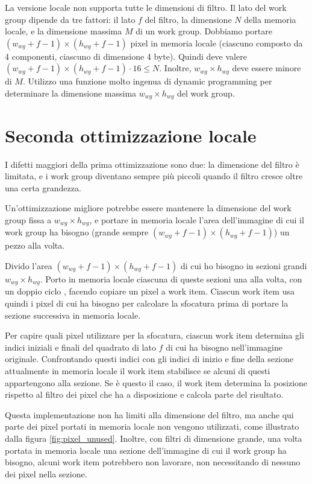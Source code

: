 \documentclass[10pt]{myarticle}
\begin{document}
La versione locale non supporta tutte le dimensioni di filtro.
Il lato del work group dipende da tre fattori: il lato $f$ del filtro, la dimensione $N$ della memoria locale, e la dimensione massima $M$ di un work group.
Dobbiamo portare $(w_{wg} + f - 1) \times (h_{wg} + f - 1)$ pixel in memoria locale (ciascuno composto da 4 componenti, ciascuno di dimensione 4 byte).
Quindi deve valere $(w_{wg} + f - 1) \times (h_{wg} + f - 1) \cdot 16 \le N$.
Inoltre, $w_{wg} \times h_{wg}$ deve essere minore di $M$.
Utilizzo una funzione molto ingenua di dynamic programming per determinare la dimensione massima $w_{wg} \times h_{wg}$ del work group.


\section{Seconda ottimizzazione locale}

I difetti maggiori della prima ottimizzazione sono due: la dimensione del filtro \`e limitata, e i work group diventano sempre pi\`u piccoli quando il filtro cresce oltre una certa grandezza.

Un'ottimizzazione migliore potrebbe essere mantenere la dimensione del work group fissa a $w_{wg} \times h_{wg}$, e portare in memoria locale l'area dell'immagine di cui il work group ha bisogno (grande sempre $(w_{wg} + f - 1) \times (h_{wg} + f - 1)$) un pezzo alla volta.

Divido l'area $(w_{wg} + f - 1) \times (h_{wg} + f - 1)$ di cui ho bisogno in sezioni grandi $w_{wg} \times h_{wg}$.
Porto in memoria locale ciascuna di queste sezioni una alla volta, con un doppio ciclo , facendo copiare un pixel a work item.
Ciascun work item usa quindi i pixel di cui ha bisogno per calcolare la sfocatura prima di portare la sezione successiva in memoria locale.

Per capire quali pixel utilizzare per la sfocatura, ciascun work item determina gli indici iniziali e finali del quadrato di lato $f$ di cui ha bisogno nell'immagine originale.
Confrontando questi indici con gli indici di inizio e fine della sezione attualmente in memoria locale il work item stabilisce se alcuni di questi appartengono alla sezione.
Se \`e questo il caso, il work item determina la posizione rispetto al filtro dei pixel che ha a disposizione e calcola parte del risultato.

Questa implementazione non ha limiti alla dimensione del filtro, ma anche qui parte dei pixel portati in memoria locale non vengono utilizzati, come illustrato dalla figura \ref{fig:pixel_unused}.
Inoltre, con filtri di dimensione grande, una volta portata in memoria locale una sezione dell'immagine di cui il work group ha bisogno, alcuni work item potrebbero non lavorare, non necessitando di nessuno dei pixel nella sezione.
\end{document}
